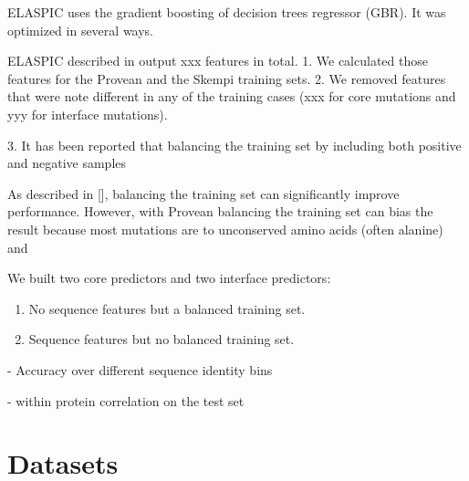 
 \label{chap:results}

ELASPIC uses the gradient boosting of decision trees regressor (GBR). It was optimized in several ways.

ELASPIC described in  output xxx features in total.
1. We calculated those features for the Provean and the Skempi training sets.
2. We removed features that were note different in any of the training cases (xxx for core mutations and yyy for interface mutations).

3. It has been reported that balancing the training set by including both positive and negative samples


As described in [], balancing the training set can significantly improve performance. However, with Provean balancing the training set can bias the result because most mutations are to unconserved amino acids (often alanine) and



We built two core predictors and two interface predictors:

\begin{enumerate}
	\item No sequence features but a balanced training set.
	\item Sequence features but no balanced training set.
\end{enumerate}

- Accuracy over different sequence identity bins

- within protein correlation on the test set


\section{Datasets}


